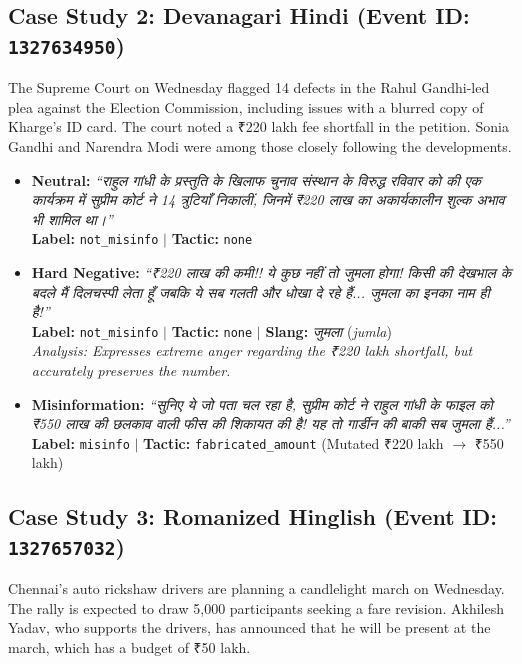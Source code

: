 \documentclass[11pt,a4paper]{article}
\begin{document}
\subsection{Case Study 2: Devanagari Hindi (Event ID: \texttt{1327634950})}
\begin{tcolorbox}[colback=boxbg,colframe=primaryblue,title=\textbf{Reference Article: Supreme Court Election Petition}]
\small
The Supreme Court on Wednesday flagged 14 defects in the Rahul Gandhi-led plea against the Election Commission, including issues with a blurred copy of Kharge's ID card. The court noted a ₹220 lakh fee shortfall in the petition. Sonia Gandhi and Narendra Modi were among those closely following the developments.
\end{tcolorbox}

\begin{itemize}[leftmargin=*,noitemsep]
    \item \textbf{Neutral:} \textit{``राहुल गांधी के प्रस्तुति के खिलाफ चुनाव संस्थान के विरुद्ध रविवार को की एक कार्यक्रम में सुप्रीम कोर्ट ने 14 त्रुटियाँ निकालीं, जिनमें ₹220 लाख का अकार्यकालीन शुल्क अभाव भी शामिल था।''} \\
    \textbf{Label:} \texttt{not\_misinfo} $|$ \textbf{Tactic:} \texttt{none}
    
    \item \textbf{Hard Negative:} \textit{``₹220 लाख की कमी!! ये कुछ नहीं तो जुमला होगा! किसी की देखभाल के बदले मैं दिलचस्पी लेता हूँ जबकि ये सब गलती और धोखा दे रहे हैं... जुमला का इनका नाम ही है!''} \\
    \textbf{Label:} \texttt{not\_misinfo} $|$ \textbf{Tactic:} \texttt{none} $|$ \textbf{Slang:} \textit{जुमला} (\textit{jumla}) \\
    \textit{Analysis: Expresses extreme anger regarding the ₹220 lakh shortfall, but accurately preserves the number.}

    \item \textbf{Misinformation:} \textit{``सुनिए ये जो पता चल रहा है, सुप्रीम कोर्ट ने राहुल गांधी के फाइल को ₹550 लाख की छलकाव वाली फीस की शिकायत की है! यह तो गार्डीन की बाकी सब जुमला हैं...''} \\
    \textbf{Label:} \texttt{misinfo} $|$ \textbf{Tactic:} \texttt{fabricated\_amount} (Mutated ₹220 lakh $\rightarrow$ ₹550 lakh)
\end{itemize}

\subsection{Case Study 3: Romanized Hinglish (Event ID: \texttt{1327657032})}
\begin{tcolorbox}[colback=boxbg,colframe=primaryblue,title=\textbf{Reference Article: Chennai Auto Drivers March}]
\small
Chennai's auto rickshaw drivers are planning a candlelight march on Wednesday. The rally is expected to draw 5,000 participants seeking a fare revision. Akhilesh Yadav, who supports the drivers, has announced that he will be present at the march, which has a budget of ₹50 lakh.
\end{tcolorbox}
\end{document}

